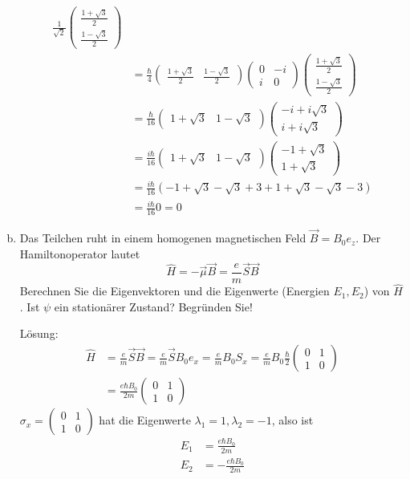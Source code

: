 \documentclass{scrartcl}
\begin{document}
\begin{enumerate}[a)]
\begin{align*}
	\frac 1{\sqrt 2}\begin{pmatrix}\frac{1+\sqrt 3}{2}\\\frac{1-\sqrt 3}{2}\end{pmatrix}\\
	&= 	
	\frac \hbar 4 \begin{pmatrix}\frac{1+\sqrt 3}{2} & \frac{1-\sqrt 3}{2}\end{pmatrix}
	\begin{pmatrix} 0&-i\\i&0 \end{pmatrix}
	\begin{pmatrix}\frac{1+\sqrt 3}{2}\\\frac{1-\sqrt 3}{2}\end{pmatrix}\\
	&=
	\frac \hbar {16} \begin{pmatrix}1+\sqrt 3 & 1-\sqrt 3\end{pmatrix}
	\begin{pmatrix}-i+i\sqrt 3\\i+i\sqrt 3\end{pmatrix}\\
	&=
	\frac {i\hbar}{16} \begin{pmatrix}1+\sqrt 3 & 1-\sqrt 3\end{pmatrix}
	\begin{pmatrix}-1+\sqrt 3\\1+\sqrt 3\end{pmatrix}\\
	&=
	\frac {i\hbar}{16} (-1 + \sqrt 3 -\sqrt 3 + 3 + 1 + \sqrt 3  -\sqrt 3 -3) \\
	&=
	\frac{i\hbar}{16} 0 = 0
\end{align*}

\item Das Teilchen ruht in einem homogenen magnetischen Feld $\vec B = B_0 e_z$. Der Hamiltonoperator lautet
\[\hat H = -\vec \mu \vec B = \frac em \vec S \vec B \]
Berechnen Sie die Eigenvektoren und die Eigenwerte (Energien $E_1, E_2$) von $\hat H$. Ist $\psi$ ein stationärer Zustand? Begründen Sie!
\item[Lösung:]
\begin{align*}
\hat H &= \frac em \vec S \vec B = \frac em \vec S B_0 e_x = \frac em B_0 S_x = \frac em B_0 \frac \hbar 2 \begin{pmatrix}0&1\\1&0\end{pmatrix} \\
&= \frac{e\hbar B_0}{2m}\begin{pmatrix}0&1\\1&0\end{pmatrix}
\end{align*}
$\sigma_x = \begin{pmatrix}0&1\\1&0\end{pmatrix}$ hat die Eigenwerte $\lambda_1 = 1, \lambda_2 = -1$, also ist
\begin{align*}
E_1 &=  \frac{e\hbar B_0}{2m}\\
E_2 &= -\frac{e\hbar B_0}{2m}
\end{align*}
\end{enumerate}
\end{document}
